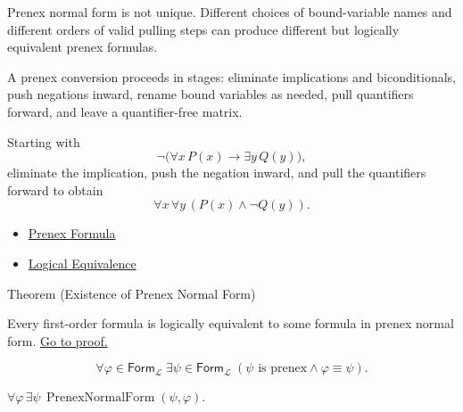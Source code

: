\begin{remark*}[Exposition]
Prenex normal form is not unique. Different choices of bound-variable names and
different orders of valid pulling steps can produce different but logically
equivalent prenex formulas.
\end{remark*}

\begin{remark*}[Exposition]
A prenex conversion proceeds in stages: eliminate implications and
biconditionals, push negations inward, rename bound variables as needed, pull
quantifiers forward, and leave a quantifier-free matrix.
\end{remark*}

\begin{remark*}[Examples]
Starting with
\[
\neg\bigl(\forall x\,P(x)\to\exists y\,Q(y)\bigr),
\]
eliminate the implication, push the negation inward, and pull the quantifiers
forward to obtain
\[
\forall x\,\forall y\,(P(x)\land\neg Q(y)).
\]
\end{remark*}

\begin{dependencies}
\begin{itemize}
  \item \hyperref[def:prenex-formula]{Prenex Formula}
  \item \hyperref[def:log-equiv]{Logical Equivalence}
\end{itemize}
\end{dependencies}

\begin{theorembox}{Theorem (Existence of Prenex Normal Form)}
\begin{theorem}
\label{thm:pnf}
Every first-order formula is logically equivalent to some formula in prenex
normal form.
\hyperref[prf:pnf]{Go to proof.}
\end{theorem}
\end{theorembox}

\begin{remark*}
\[
\forall \varphi\in\mathsf{Form}_{\mathcal L}\;
\exists \psi\in\mathsf{Form}_{\mathcal L}\;
(\psi \text{ is prenex}\land \varphi\equiv\psi).
\]
\end{remark*}

\begin{remark*}
\(\forall\varphi\,
\exists\psi\,\operatorname{PrenexNormalForm}(\psi,\varphi)\).
\end{remark*}

